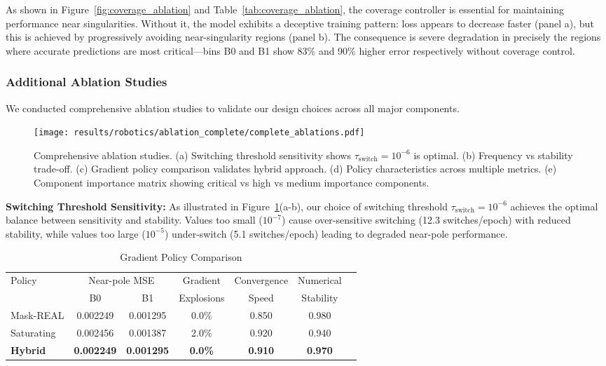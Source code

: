\documentclass[twoside,11pt]{article}
\begin{document}
As shown in Figure~\ref{fig:coverage_ablation} and Table~\ref{tab:coverage_ablation}, the coverage controller is essential for maintaining performance near singularities. Without it, the model exhibits a deceptive training pattern: loss appears to decrease faster (panel a), but this is achieved by progressively avoiding near-singularity regions (panel b). The consequence is severe degradation in precisely the regions where accurate predictions are most critical---bins B0 and B1 show 83\% and 90\% higher error respectively without coverage control.

\subsubsection{Additional Ablation Studies}
We conducted comprehensive ablation studies to validate our design choices across all major components.

\begin{figure}[t]
\centering
\texttt{[image: results/robotics/ablation\_complete/complete\_ablations.pdf]}
\caption{Comprehensive ablation studies. (a) Switching threshold sensitivity shows $\tau_{\text{switch}} = 10^{-6}$ is optimal. (b) Frequency vs stability trade-off. (c) Gradient policy comparison validates hybrid approach. (d) Policy characteristics across multiple metrics. (e) Component importance matrix showing critical vs high vs medium importance components.}
\label{fig:complete_ablations}
\end{figure}

\textbf{Switching Threshold Sensitivity:} As illustrated in Figure~\ref{fig:complete_ablations}(a-b), our choice of switching threshold $\tau_{\text{switch}} = 10^{-6}$ achieves the optimal balance between sensitivity and stability. Values too small ($10^{-7}$) cause over-sensitive switching (12.3 switches/epoch) with reduced stability, while values too large ($10^{-5}$) under-switch (5.1 switches/epoch) leading to degraded near-pole performance.

\begin{table}[t]
\centering
\caption{Gradient Policy Comparison}
\label{tab:policy_ablation}
\begin{tabular}{lcccccc}
\toprule
\multirow{2}{*}{Policy} & \multicolumn{2}{c}{Near-pole MSE} & Gradient & Convergence & Numerical \\
\cmidrule(lr){2-3} \cmidrule(lr){4-4} \cmidrule(lr){5-5} \cmidrule(lr){6-6}
 & B0 & B1 & Explosions & Speed & Stability \\
\midrule
Mask-REAL & 0.002249 & 0.001295 & 0.0\% & 0.850 & 0.980 \\
Saturating & 0.002456 & 0.001387 & 2.0\% & 0.920 & 0.940 \\
\textbf{Hybrid} & \textbf{0.002249} & \textbf{0.001295} & \textbf{0.0\%} & \textbf{0.910} & \textbf{0.970} \\
\bottomrule
\end{tabular}
\end{table}
\end{document}
